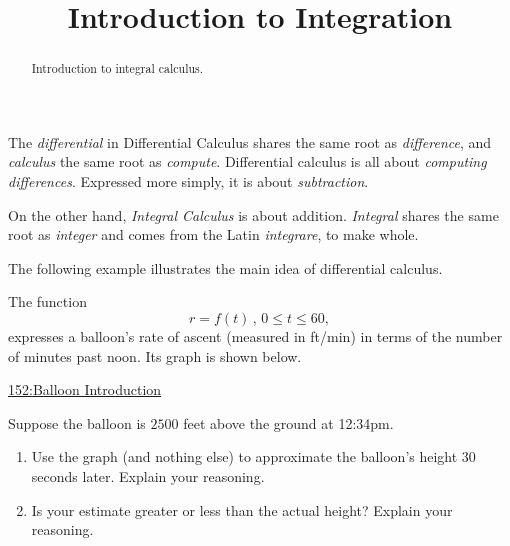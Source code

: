 \documentclass{ximera}
\title{Introduction to Integration}
\begin{document}
\begin{abstract}
Introduction to integral calculus.
\end{abstract}
\maketitle

The \emph{differential} in Differential Calculus shares the same root as \emph{difference}, and \emph{calculus} the same root as \emph{compute}. Differential calculus is all about \emph{computing differences}. Expressed more simply, it is about \emph{subtraction}.


On the other hand, \emph{Integral Calculus} is about addition. \emph{Integral} shares the same root as \emph{integer} and comes from the Latin \emph{integrare}, to make whole. 

The following example illustrates the main idea of differential calculus.

\begin{example}  \label{Ex:98dfrghha}

The function 
\[
    r = f(t) \, , \, 0\leq t \leq  60 , 
\]
expresses a balloon's rate of ascent (measured in ft/min) in terms of the number of minutes past noon. Its graph is shown below.

\begin{onlineOnly}
    \begin{center}
\end{center}
\end{onlineOnly}

\href{https://www.desmos.com/calculator/tgi5yiuzab}{152:Balloon Introduction}

Suppose the balloon is $2500$ feet above the ground at 12:34pm. 

\begin{enumerate}

\item Use the graph (and nothing else) to approximate the balloon's height $30$ seconds later. Explain your reasoning.

\item Is your estimate greater or less than the actual height? Explain your reasoning.

\end{enumerate}
\end{example}
\end{document}
